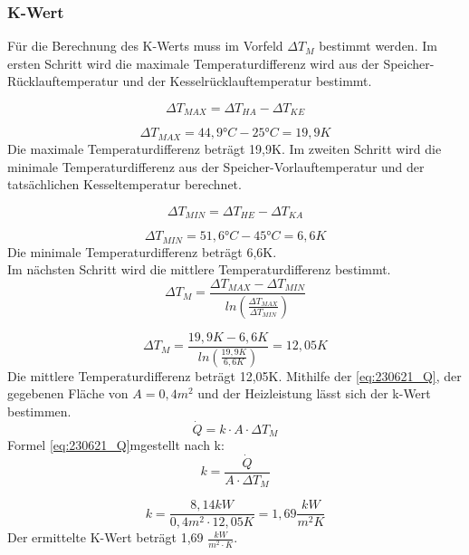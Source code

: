 \subsubsection*{K-Wert}
Für die Berechnung des K-Werts muss im Vorfeld $\Delta T_M$ bestimmt werden.
Im ersten Schritt wird die maximale Temperaturdifferenz wird aus der Speicher-Rücklauftemperatur und der Kesselrücklauftemperatur bestimmt.

\begin{equation}
    \Delta T_{MAX}= \Delta T_{HA}-\Delta T_{KE}
    \label{eq:230621_DeltaTMAX}
\end{equation}

$$\Delta T_{MAX}= 44,9\text{°}C-25 \text{°} C= 19,9K$$
Die maximale Temperaturdifferenz beträgt 19,9K.
Im zweiten Schritt wird die minimale Temperaturdifferenz aus der Speicher-Vorlauftemperatur und der tatsächlichen Kesseltemperatur berechnet.

\begin{equation}
    \Delta T_{MIN}= \Delta T_{HE}-\Delta T_{KA}
    \label{eq:230621_DeltaTMIN}
\end{equation}

$$\Delta T_{MIN}= 51,6 \text{°} C-45 \text{°} C= 6,6K$$
Die minimale Temperaturdifferenz beträgt 6,6K.\\
Im nächsten Schritt wird die mittlere Temperaturdifferenz bestimmt.
\begin{equation}
    \Delta T_{M}= \frac{\Delta T_{MAX}-\Delta T_{MIN}}{ln(\frac{\Delta T_{MAX}}{\Delta T_{MIN}})}
    \label{eq:230621_DeltaTM}
\end{equation}

$$\Delta T_M= \frac{19,9K-6,6K}{ln(\frac{19,9K}{6,6K})}= 12,05K$$
Die mittlere Temperaturdifferenz beträgt 12,05K.
\newpage
Mithilfe der \autoref{eq:230621_Q}, der gegebenen Fläche von $A= 0,4m^2$ und der Heizleistung lässt sich der k-Wert bestimmen.
\begin{equation}
    \dot{Q}=k\cdot A \cdot \Delta T_M
    \label{eq:230621_Q}
\end{equation}
Formel \ref*{eq:230621_Q}mgestellt nach k:
\begin{equation}
    k = \frac{\dot{Q}}{ A \cdot \Delta T_M} 
    \label{eq:230621_k}
\end{equation}

$$k=\frac{8,14 kW}{ 0,4m^2 \cdot 12,05K}=1,69 \frac{kW}{m^2K}$$
Der ermittelte K-Wert beträgt 1,69 $\frac{kW}{m^2\cdot K}$.
